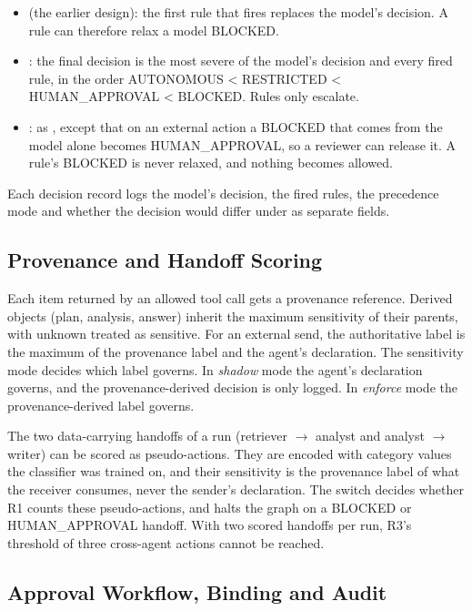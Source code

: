 \documentclass{ieeeaccess}
\begin{document}
\begin{itemize}
\item \textbf{} (the earlier design): the first rule that fires replaces the model's decision. A rule can therefore relax a model BLOCKED.
\item \textbf{}: the final decision is the most severe of the model's decision and every fired rule, in the order AUTONOMOUS < RESTRICTED < HUMAN\_APPROVAL < BLOCKED. Rules only escalate.
\item \textbf{}: as , except that on an external action a BLOCKED that comes from the model alone becomes HUMAN\_APPROVAL, so a reviewer can release it. A rule's BLOCKED is never relaxed, and nothing becomes allowed.
\end{itemize}

Each decision record logs the model's decision, the fired rules, the precedence mode and whether the decision would differ under  as separate fields. %


\subsection{Provenance and Handoff Scoring}

Each item returned by an allowed tool call gets a provenance reference. Derived objects (plan, analysis, answer) inherit the maximum sensitivity of their parents, with unknown treated as sensitive. For an external send, the authoritative label is the maximum of the provenance label and the agent's declaration. The sensitivity mode decides which label governs. In \emph{shadow} mode the agent's declaration governs, and the provenance-derived decision is only logged. In \emph{enforce} mode the provenance-derived label governs. %


The two data-carrying handoffs of a run (retriever $\rightarrow$ analyst and analyst $\rightarrow$ writer) can be scored as pseudo-actions. They are encoded with category values the classifier was trained on, and their sensitivity is the provenance label of what the receiver consumes, never the sender's declaration. %
The switch  decides whether R1 counts these pseudo-actions, and  halts the graph on a BLOCKED or HUMAN\_APPROVAL handoff. %
With two scored handoffs per run, R3's threshold of three cross-agent actions cannot be reached. %


\subsection{Approval Workflow, Binding and Audit}
\end{document}
